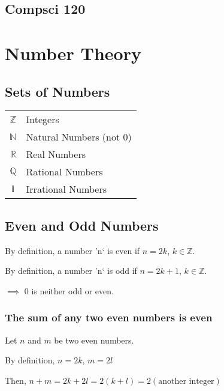 \documentclass[12pt] {article}
\begin{document}
\begin{center}
  \section*{Compsci 120}
\end{center}
\section*{Number Theory}
\subsection*{Sets of Numbers}
\begin{tabular}{c|l}
  $\mathbb{Z}$ & Integers \\
  $\mathbb{N}$ & Natural Numbers (not 0)\\
  $\mathbb{R}$ & Real Numbers \\
  $\mathbb{Q}$ & Rational Numbers \\
  $\mathbb{I}$ & Irrational Numbers \\
\end{tabular}

\subsection*{Even and Odd Numbers}
\begin{center}
By definition, a number 'n` is even if $n=2k$, $k \in \mathbb{Z}$.
\end{center}
\begin{center}
By definition, a number 'n` is odd if $n=2k+1$, $k \in \mathbb{Z}$.
\end{center}
\begin{center}
  $\implies$ 0 is neither odd or even. 
\end{center}

\subsubsection*{The sum of any two even numbers is even}
\begin{center}
  Let $n$ and $m$ be two even numbers.
\end{center}
\begin{center}
  By definition, $n=2k$, $m=2l$
\end{center}
\begin{center}
  Then, $n+m=2k+2l=2(k+l)=2(\text{another integer})$
\end{center}
\end{document}
